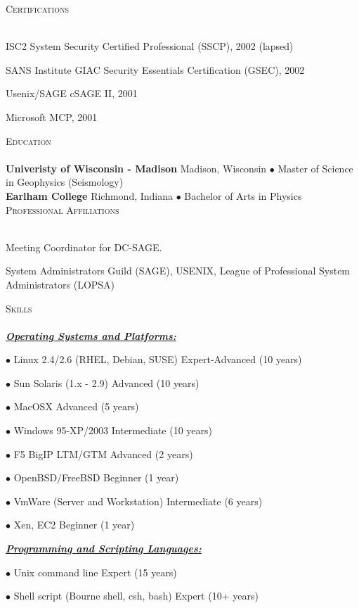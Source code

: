 \documentclass{article}
\newcommand{\lineunder}{\vspace*{-8pt} \\ \hspace*{-18pt} \hrulefill \\}
\newcommand{\header}[1]{{\hspace*{-15pt}\vspace*{6pt} \textsc{#1}} \vspace*{-6pt} \lineunder}
\newcommand{\skillset}[1]{{ \underline{\textbf{\emph{#1}}}\\  }}
\newcommand{\skill}[2]{{$\bullet$ #1 \hfill #2 }}
\newenvironment{achievements}{\begin{list}{\topsep 0pt \itemsep -2pt}} {\vspace*{4pt}\end{list}}
\newcommand{\school}[3]{
 \textbf{#1} #2 $\bullet$ #3\\ 
}
\begin{document}
\header{Certifications}
\begin{achievements}
\item ISC2 System Security Certified Professional (SSCP), 2002 (lapsed)
\item SANS Institute GIAC Security Essentials Certification (GSEC), 2002
\item Usenix/SAGE cSAGE II, 2001
\item Microsoft MCP, 2001
\end{achievements}

\header{Education}

\school{Univeristy of Wisconsin - Madison}{Madison, Wisconsin} {Master of Science in Geophysics (Seismology)}
\school{Earlham College}{Richmond, Indiana}{Bachelor of Arts in Physics}

\header{Professional Affiliations}
\begin{achievements}
\item Meeting Coordinator for DC-SAGE.  
\item System Administrators Guild (SAGE), USENIX, League of Professional System Administrators (LOPSA) 
\end{achievements}


\header{Skills}

\skillset{Operating Systems and Platforms: }

\skill{Linux 2.4/2.6 (RHEL, Debian, SUSE)}{Expert-Advanced (10 years)}

\skill{Sun Solaris (1.x - 2.9)}{Advanced (10 years)}

\skill{MacOSX}{Advanced (5 years)}

\skill{Windows 95-XP/2003}{Intermediate (10 years)}

\skill{F5 BigIP LTM/GTM}{Advanced (2 years)}

\skill{OpenBSD/FreeBSD}{Beginner (1 year)}

\skill{VmWare (Server and Workstation)}{Intermediate (6 years)}

\skill{Xen, EC2}{Beginner (1 year)}



\skillset{Programming and Scripting Languages: }

\skill{Unix command line}{Expert (15 years)}

\skill{Shell script (Bourne shell, csh, bash)}{Expert (10+ years)}
\end{document}
